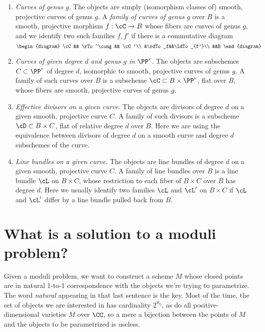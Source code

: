 \begin{enumerate}\label{list of moduli problems}
\item \emph{Curves of genus $g$}. The objects are simply (isomorphism classes of) smooth, projective curves of genus $g$. A \emph{family of curves of genus $g$} over $B$ is a smooth, projective morphism $f : \cC \to B$ whose fibers are  curves of genus $g$, and we identify two such families $f, f'$ if there is a commutative diagram
$$
\begin{diagram}
\cC && \rTo^\cong && \cC'\\
&\rdTo_f&&\ldTo_{f'}\\
&&B
\end{diagram}
$$

\item \emph{Curves of given degree $d$ and genus $g$ in $\PP^r$}. The objects are subschemes $C \subset \PP^r$ of degree $d$, isomorphic to smooth, projective curves of genus $g$. A family of such curves over $B$ is a subscheme $\cC \subset B \times \PP^r$, flat over $B$,  whose fibers are smooth, projective curves of genus $g$.

\item \emph{Effective divisors on a given curve}. The objects are divisors of degree $d$ on a given smooth, projective curve $C$. A family of such divisors is a subscheme $\cD \subset B \times C$, flat of relative degree $d$ over $B$. Here we are using
the equivalence between divisors of degree $d$ on a smooth curve and degree $d$ subschemes of the curve.

\item \emph{Line bundles on a given curve}. The objects are line bundles of degree $d$ on a given smooth, projective curve $C$. A family of line bundles over $B$ is a line bundle $\cL$ on $B \times C$, whose restriction to each fiber of $B \times C$ over $B$ has degree $d$. Here we usually identify two families $\cL$ and $\cL'$ on $B \times C$ if $\cL$ and $\cL'$ differ by a line
bundle pulled back from $B$.

\end{enumerate}

\section{What is a solution to a moduli problem?}

Given a moduli problem, we want to construct a scheme $M$ whose closed points are in natural  1-to-1 correspondence with the objects we're trying to parametrize. The word \emph{natural} appearing in that last sentence is the key. Most of the time, the set of objects we are interested in has cardinality $2^{\aleph_0}$, as do all positive-dimensional varieties $M$ over $\CC$, so a mere a bijection between the points of $M$ and the objects to be parametrized is useless.

